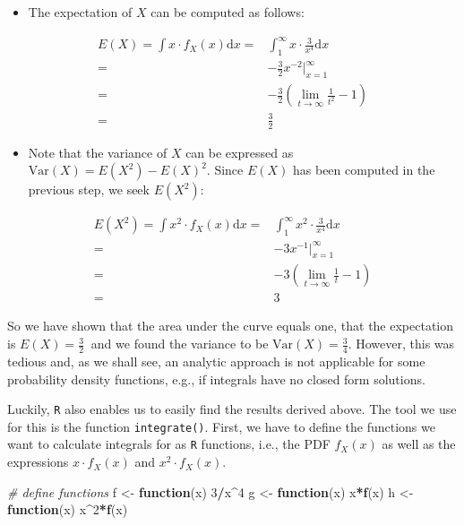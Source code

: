 \documentclass[]{book}
\newenvironment{Shaded}{\begin{snugshade}}{\end{snugshade}}
\newcommand{\KeywordTok}[1]{\textcolor[rgb]{0.13,0.29,0.53}{\textbf{#1}}}
\newcommand{\DecValTok}[1]{\textcolor[rgb]{0.00,0.00,0.81}{#1}}
\newcommand{\StringTok}[1]{\textcolor[rgb]{0.31,0.60,0.02}{#1}}
\newcommand{\CommentTok}[1]{\textcolor[rgb]{0.56,0.35,0.01}{\textit{#1}}}
\newcommand{\ControlFlowTok}[1]{\textcolor[rgb]{0.13,0.29,0.53}{\textbf{#1}}}
\newcommand{\OperatorTok}[1]{\textcolor[rgb]{0.81,0.36,0.00}{\textbf{#1}}}
\newcommand{\NormalTok}[1]{#1}
\providecommand{\tightlist}{%
  \setlength{\itemsep}{0pt}\setlength{\parskip}{0pt}}
\theoremstyle{definition}
\theoremstyle{definition}
\theoremstyle{definition}
\theoremstyle{remark}
\begin{document}
\begin{itemize}
\tightlist
\item
  The expectation of \(X\) can be computed as follows:
\end{itemize}

\begin{align}
 E(X) = \int x \cdot f_X(x) \mathrm{d}x =&  \int_{1}^{\infty} x \cdot \frac{3}{x^4} \mathrm{d}x \\
  =& - \frac{3}{2} x^{-2} \rvert_{x=1}^{\infty} \\
  =& -\frac{3}{2} \left( \lim_{t \rightarrow \infty} \frac{1}{t^2} - 1 \right) \\
  =& \frac{3}{2}
\end{align}

\begin{itemize}
\tightlist
\item
  Note that the variance of \(X\) can be expressed as
  \(\text{Var}(X) = E(X^2) - E(X)^2\). Since \(E(X)\) has been computed
  in the previous step, we seek \(E(X^2)\):
\end{itemize}

\begin{align}
 E(X^2)= \int x^2 \cdot f_X(x) \mathrm{d}x =&  \int_{1}^{\infty} x^2 \cdot \frac{3}{x^4} \mathrm{d}x \\
  =& -3 x^{-1} \rvert_{x=1}^{\infty} \\
  =& -3 \left( \lim_{t \rightarrow \infty} \frac{1}{t} - 1 \right) \\
  =& 3
\end{align}

So we have shown that the area under the curve equals one, that the
expectation is \(E(X)=\frac{3}{2} \ \) and we found the variance to be
\(\text{Var}(X) = \frac{3}{4}\). However, this was tedious and, as we
shall see, an analytic approach is not applicable for some probability
density functions, e.g., if integrals have no closed form solutions.

Luckily, \texttt{R} also enables us to easily find the results derived
above. The tool we use for this is the function \texttt{integrate()}.
First, we have to define the functions we want to calculate integrals
for as \texttt{R} functions, i.e., the PDF \(f_X(x)\) as well as the
expressions \(x\cdot f_X(x)\) and \(x^2\cdot f_X(x)\).

\begin{Shaded}
\begin{Highlighting}[]
\CommentTok{# define functions}
\NormalTok{f <-}\StringTok{ }\ControlFlowTok{function}\NormalTok{(x) }\DecValTok{3}\OperatorTok{/}\NormalTok{x}\OperatorTok{^}\DecValTok{4}
\NormalTok{g <-}\StringTok{ }\ControlFlowTok{function}\NormalTok{(x) x}\OperatorTok{*}\KeywordTok{f}\NormalTok{(x)}
\NormalTok{h <-}\StringTok{ }\ControlFlowTok{function}\NormalTok{(x) x}\OperatorTok{^}\DecValTok{2}\OperatorTok{*}\KeywordTok{f}\NormalTok{(x)}
\end{Highlighting}
\end{Shaded}
\end{document}
